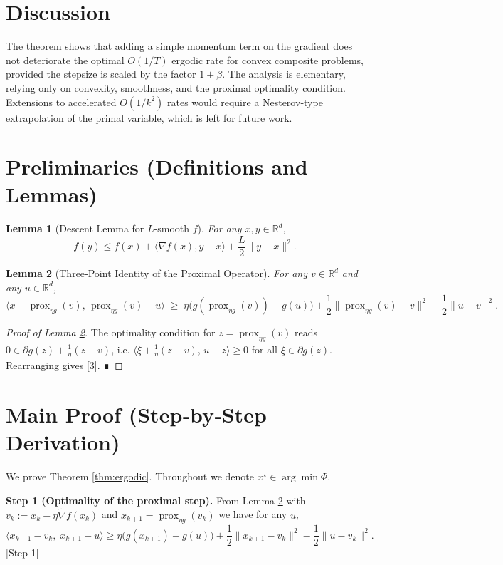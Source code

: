 \documentclass{article}
\newtheorem{lemma}{Lemma}
\newcommand{\prox}{\operatorname{prox}}
\begin{document}
\section*{Discussion}
The theorem shows that adding a simple momentum term on the gradient does not deteriorate the optimal $O(1/T)$ ergodic rate for convex composite problems, provided the stepsize is scaled by the factor $1+\beta$. The analysis is elementary, relying only on convexity, smoothness, and the proximal optimality condition. Extensions to accelerated $O(1/k^{2})$ rates would require a Nesterov‑type extrapolation of the primal variable, which is left for future work.

\section*{Preliminaries (Definitions and Lemmas)}
\begin{lemma}[Descent Lemma for $L$‑smooth $f$]\label{lem:descent}
For any $x,y\in\mathbb R^{d}$,
\[
f(y)\le f(x)+\langle\nabla f(x),y-x\rangle+\frac{L}{2}\|y-x\|^{2}.
\]
\end{lemma}
\begin{lemma}[Three‑Point Identity of the Proximal Operator]\label{lem:prox}
For any $v\in\mathbb R^{d}$ and any $u\in\mathbb R^{d}$,
\[
\langle x-\prox_{\eta g}(v),\,\prox_{\eta g}(v)-u\rangle
\;\ge\;
\eta\bigl(g(\prox_{\eta g}(v))-g(u)\bigr)+\frac{1}{2}\bigl\|\prox_{\eta g}(v)-v\bigr\|^{2}
-\frac{1}{2}\bigl\|u-v\bigr\|^{2}.
\tag{3}
\]
\end{lemma}
\begin{proof}[Proof of Lemma \ref{lem:prox}]
The optimality condition for $z=\prox_{\eta g}(v)$ reads  
$0\in \partial g(z)+\frac{1}{\eta}(z-v)$, i.e.  
$\langle \xi +\frac{1}{\eta}(z-v),\,u-z\rangle\ge0$ for all $\xi\in\partial g(z)$.  
Rearranging gives \eqref{3}. ∎
\end{proof}

\section*{Main Proof (Step‑by‑Step Derivation)}
We prove Theorem \ref{thm:ergodic}.  Throughout we denote $x^\star\in\arg\min\Phi$.

\noindent\textbf{Step 1 (Optimality of the proximal step).}  
From Lemma \ref{lem:prox} with $v_k:=x_k-\eta\tilde\nabla f(x_k)$ and $x_{k+1}=\prox_{\eta g}(v_k)$ we have for any $u$,
\[
\langle x_{k+1}-v_k,\;x_{k+1}-u\rangle
\ge \eta\bigl(g(x_{k+1})-g(u)\bigr)
+\frac{1}{2}\|x_{k+1}-v_k\|^{2}
-\frac{1}{2}\|u-v_k\|^{2}.
\tag{4}
\] 
[Step 1]
\end{document}
